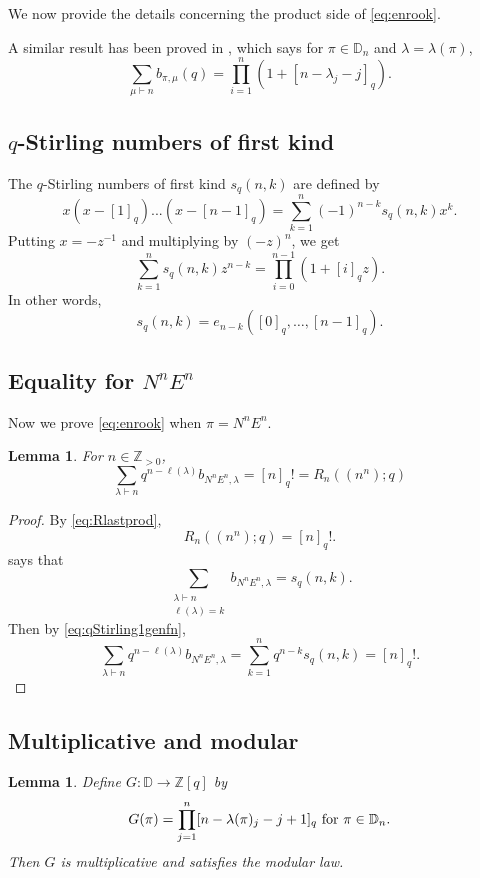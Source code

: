 \documentclass[12pt,reqno]{amsart}
\theoremstyle{plain}
\newtheorem{lemma}[theorem]{Lemma}
\theoremstyle{definition}
\theoremstyle{remark}
\theoremstyle{example}
\numberwithin{equation}{section}
\newcommand\ZZ{\mathbb{Z}}
\newcommand{\DD}{\mathbb{D}}
\begin{document}
We now provide the details concerning the product side of \eqref{eq:enrook}.

A similar result has been proved in \cite[Proposition 3.8]{Abreu_Nigro_forests}, which says for $\pi \in \DD_n$ and $\lambda = \lambda(\pi)$, $$ \sum_{\mu \vdash n}^{} b_{\pi,\mu}(q) = \prod_{i=1}^{n} (1+[n-\lambda_j-j]_q).$$ 

\subsection{$q$-Stirling numbers of first kind}

The $q$-Stirling numbers of first kind $s_{q}(n,k)$ are defined by \cite[page 4]{Abreu_Nigro_forests}
\begin{equation*}\label{eq:qStirling1def}
	x(x-[1]_{q})...(x-[n-1]_{q})=\sum_{k=1}^{n}(-1)^{n-k}s_{q}(n,k)x^{k}.
\end{equation*}
Putting $x=-z^{-1}$ and multiplying by $(-z)^n$, we get \begin{equation}\label{eq:qStirling1genfn}
		\sum_{k=1}^{n} s_q(n,k)z^{n-k} = \prod_{i=0}^{n-1}(1+[i]_qz).
	\end{equation}
	In other words, $$s_q(n,k) = e_{n-k}([0]_q,\ldots,[n-1]_q).$$

\subsection{Equality for $N^nE^n$}
Now we prove \eqref{eq:enrook}  when $\pi = N^nE^n$.
\begin{lemma}\label{prop:R_nsquare} For $n\in \ZZ_{>0}$,
	\begin{equation}\label{eq:Rnnn}
		\sum_{\lambda\vdash n}q^{n-\ell(\lambda)}b_{N^{n}E^{n},\lambda} = [n]_{q}! = R_n((n^n);q)
	\end{equation}
\end{lemma}
\begin{proof}
	By \eqref{eq:Rlastprod}, $$ R_n((n^n);q) = [n]_q!.$$
	\cite[Corollary 3.7]{Abreu_Nigro_forests} says that 
	$$\sum_{\substack{\lambda\vdash n\\ \ell(\lambda)=k}}b_{N^{n}E^{n},\lambda}=s_{q}(n,k).$$
	Then by \eqref{eq:qStirling1genfn},
	$$\sum_{\lambda\vdash n}q^{n-\ell(\lambda)}b_{N^{n}E^{n},\lambda}=\sum_{k=1}^{n}q^{n-k}s_{q}(n,k)=[n]_{q}!.$$ 
\end{proof}

\subsection{Multiplicative and modular}
\begin{lemma}\label{prop:partoprodmodular}
	Define $G: \DD \to \ZZ[q]$ by $$ G(\pi) =  \prod_{j=1}^{n}[n-\lambda(\pi)_{j}-j+1]_{q} \hbox{ for } \pi \in \DD_n.$$ Then $G$ is multiplicative and satisfies the modular law.
\end{lemma}
\end{document}
